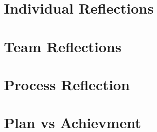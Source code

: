 \section{Individual Reflections}

\section{Team Reflections}

\section{Process Reflection}

\section{Plan vs Achievment}
